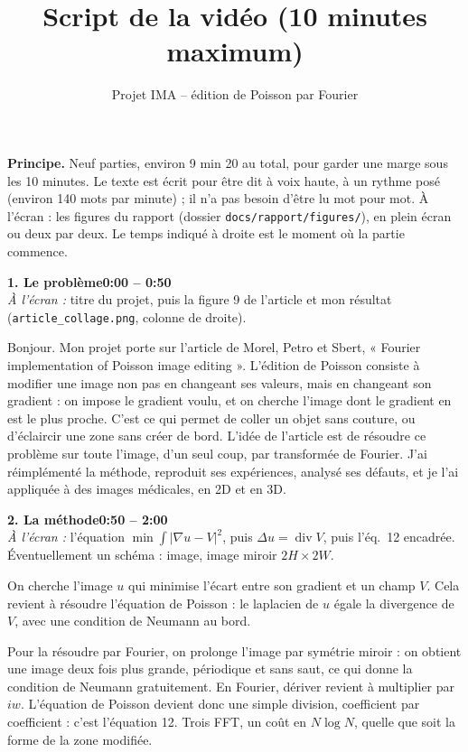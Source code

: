 \documentclass[11pt,a4paper]{article}
\title{Script de la vidéo (10 minutes maximum)}
\author{Projet IMA -- édition de Poisson par Fourier}
\date{}
\newcommand{\partie}[3]{\bigskip\noindent\colorbox{gray!15}{\parbox{\dimexpr\linewidth-2\fboxsep}{%
  \textbf{#1}\hfill\textbf{#2}\\ \small\textit{À l'écran :} #3}}\par}
\begin{document}
\maketitle

\textbf{Principe.} Neuf parties, environ 9 min 20 au total, pour garder une marge sous les 10 minutes.
Le texte est écrit pour être dit à voix haute, à un rythme posé (environ 140 mots par minute) ; il n'a
pas besoin d'être lu mot pour mot. À l'écran : les figures du rapport (dossier \texttt{docs/rapport/figures/}), en plein
écran ou deux par deux. Le temps indiqué à droite est le moment où la partie commence.

\partie{1. Le problème}{0:00 -- 0:50}{titre du projet, puis la figure 9 de l'article et mon résultat
(\texttt{article\_collage.png}, colonne de droite).}

Bonjour. Mon projet porte sur l'article de Morel, Petro et Sbert, « Fourier implementation of Poisson
image editing ». L'édition de Poisson consiste à modifier une image non pas en changeant ses valeurs, mais
en changeant son gradient : on impose le gradient voulu, et on cherche l'image dont le gradient en est le
plus proche. C'est ce qui permet de coller un objet sans couture, ou d'éclaircir une zone sans créer de
bord. L'idée de l'article est de résoudre ce problème sur toute l'image, d'un seul coup, par transformée
de Fourier. J'ai réimplémenté la méthode, reproduit ses expériences, analysé ses défauts, et je l'ai
appliquée à des images médicales, en 2D et en 3D.

\partie{2. La méthode}{0:50 -- 2:00}{l'équation $\min\int|\nabla u - V|^2$, puis $\Delta u =
\operatorname{div}V$, puis l'éq.~12 encadrée. Éventuellement un schéma : image, image miroir $2H\times2W$.}

On cherche l'image $u$ qui minimise l'écart entre son gradient et un champ $V$. Cela revient à résoudre
l'équation de Poisson : le laplacien de $u$ égale la divergence de $V$, avec une condition de Neumann au
bord.

Pour la résoudre par Fourier, on prolonge l'image par symétrie miroir : on obtient une image deux fois
plus grande, périodique et sans saut, ce qui donne la condition de Neumann gratuitement. En Fourier,
dériver revient à multiplier par $iw$. L'équation de Poisson devient donc une simple division, coefficient
par coefficient : c'est l'équation 12. Trois FFT, un coût en $N\log N$, quelle que soit la forme de la
zone modifiée.
\end{document}
